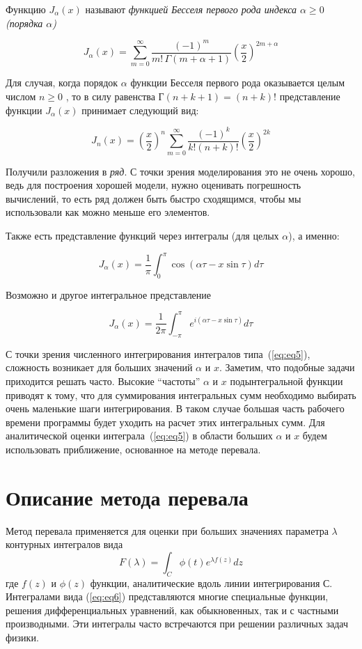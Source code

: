 \documentclass[14pt]{extarticle}
\begin{document}
Функцию $J_\alpha(x)$ называют \textit{функцией Бесселя первого рода индекса $\alpha \ge 0$ (порядка  $\alpha$)}

$$
	J_\alpha(x) = \sum_{m=0}^\infty \frac{(-1)^m}{m!\, \Gamma(m+\alpha+1)} {\left({\frac{x}{2}}\right)}^{2m+\alpha} 
$$

Для случая, когда порядок $\alpha$ функции Бесселя первого рода оказывается целым числом $n \ge 0$ , то в силу равенства $Г(n+k+1)=(n+k)!$ представление функции $J_\alpha(x)$ принимает следующий вид:

$$
J_n(x)=\left(\frac{x}{2}\right)^n\sum_{m=0}^{\infty}\frac{(-1)^k}{k! (n+k)!}{\left(\frac{x}{2}\right)}^{2k}
$$

Получили разложения в \textit{ряд}. С точки зрения моделирования это не очень хорошо, ведь для построения хорошей модели, нужно оценивать погрешность вычислений, то есть ряд должен быть быстро сходящимся, чтобы мы использовали как можно меньше его элементов. 

Также есть представление функций через интегралы (для целых $\alpha$), а именно:

$$
J_\alpha(x)=\frac{1}{\pi}\int_{0}^{\pi}\cos(\alpha\tau-x\sin\tau)d\tau
$$

Возможно и другое интегральное представление\cite{Fedoryuk}

\begin{equation}\label{eq:eq5}
J_\alpha(x)=\frac{1}{2\pi}\int_{-\pi}^{\pi}e^{i(\alpha\tau-x\sin\tau)}d\tau
\end{equation} 

С точки зрения численного интегрирования интегралов типа~(\ref{eq:eq5}), сложность возникает для больших значений $\alpha$ и $x$. Заметим, что
подобные задачи приходится решать часто. Высокие ``частоты'' $\alpha$ и $x$ подынтегральной функции приводят к тому, что для суммирования интегральных сумм необходимо выбирать очень маленькие шаги интегрирования. В таком случае большая часть рабочего времени программы будет уходить на расчет этих интегральных сумм. Для аналитической оценки интеграла~(\ref{eq:eq5}) в области больших $\alpha$ и $x$ будем использовать приближение, основанное на методе перевала.

\section{Описание метода перевала} 

Метод перевала применяется для оценки при больших значениях параметра $\lambda$ контурных интегралов вида
\begin{equation}\label{eq:eq6}
F(\lambda) = \int_{C}^{}\phi(t)e^{\lambda f(z)}dz
\end{equation} 
где $f(z)$ и $\phi(z)$ функции, аналитические вдоль линии интегрирования С. Интегралами вида (\ref{eq:eq6}) представляются многие специальные функции, решения дифференциальных уравнений, как обыкновенных, так и с частными производными. Эти интегралы часто встречаются при решении различных задач физики.
\end{document}
